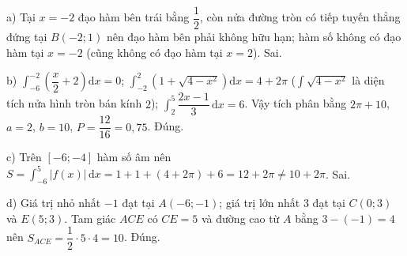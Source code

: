 \begin{ex}
{a) Tại $x=-2$ đạo hàm bên trái bằng $\dfrac12$, còn nửa đường tròn có tiếp tuyến thẳng đứng tại $B(-2;1)$ nên đạo hàm bên phải không hữu hạn; hàm số không có đạo hàm tại $x=-2$ (cũng không có đạo hàm tại $x=2$). Sai.

b) $\displaystyle\int_{-6}^{-2}\left(\dfrac x2+2\right)\mathrm dx=0$; $\displaystyle\int_{-2}^{2}\left(1+\sqrt{4-x^2}\right)\mathrm dx=4+2\pi$ ($\int\sqrt{4-x^2}$ là diện tích nửa hình tròn bán kính $2$); $\displaystyle\int_2^5\dfrac{2x-1}{3}\,\mathrm dx=6$. Vậy tích phân bằng $2\pi+10$, $a=2$, $b=10$, $P=\dfrac{12}{16}=0{,}75$. Đúng.

c) Trên $[-6;-4]$ hàm số âm nên $S=\displaystyle\int_{-6}^{5}|f(x)|\,\mathrm dx=1+1+(4+2\pi)+6=12+2\pi\ne10+2\pi$. Sai.

d) Giá trị nhỏ nhất $-1$ đạt tại $A(-6;-1)$; giá trị lớn nhất $3$ đạt tại $C(0;3)$ và $E(5;3)$. Tam giác $ACE$ có $CE=5$ và đường cao từ $A$ bằng $3-(-1)=4$ nên $S_{ACE}=\dfrac12\cdot5\cdot4=10$. Đúng.}
\end{ex}
